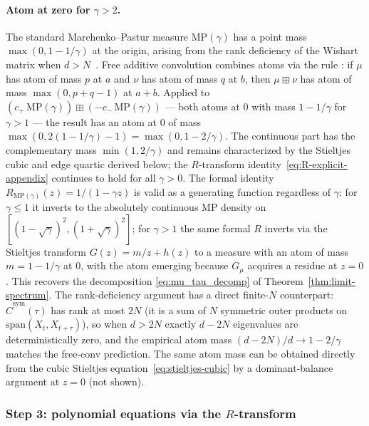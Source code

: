\documentclass{article}
\begin{document}
\paragraph{Atom at zero for $\gamma > 2$.}
The standard Marchenko--Pastur measure $\mathrm{MP}(\gamma)$ has a
point mass $\max(0, 1-1/\gamma)$ at the origin, arising from the
rank deficiency of the Wishart matrix when $d > N$~\cite{marchenko1967, bai2010}.
Free additive convolution combines atoms via the rule
\cite{nica2006}: if $\mu$ has atom of mass $p$ at $a$ and $\nu$ has
atom of mass $q$ at $b$, then $\mu \boxplus \nu$ has atom of mass
$\max(0, p + q - 1)$ at $a + b$. Applied to
$(c_+\,\mathrm{MP}(\gamma)) \boxplus (-c_-\,\mathrm{MP}(\gamma))$ —
both atoms at $0$ with mass $1 - 1/\gamma$ for $\gamma > 1$ — the
result has an atom at $0$ of mass
$\max(0, 2(1 - 1/\gamma) - 1) = \max(0, 1 - 2/\gamma)$. The continuous
part has the complementary mass $\min(1, 2/\gamma)$ and remains
characterized by the Stieltjes cubic and edge quartic derived below;
the $R$-transform identity~\eqref{eq:R-explicit-appendix} continues to
hold for all $\gamma > 0$. The formal identity $R_{\mathrm{MP}(\gamma)}(z) = 1/(1-\gamma z)$ is valid as a generating function regardless of $\gamma$: for $\gamma \le 1$ it inverts to the absolutely continuous MP density on $[(1-\sqrt\gamma)^2, (1+\sqrt\gamma)^2]$; for $\gamma > 1$ the same formal $R$ inverts via the Stieltjes transform $G(z) = m/z + h(z)$ to a measure with an atom of mass $m = 1 - 1/\gamma$ at $0$, with the atom emerging because $G_\mu$ acquires a residue at $z = 0$. This recovers the decomposition
\eqref{eq:mu_tau_decomp} of Theorem~\ref{thm:limit-spectrum}. The
rank-deficiency argument has a direct finite-$N$ counterpart:
$\hat C^{\mathrm{sym}}(\tau)$ has rank at most $2N$ (it is a sum of $N$ symmetric
outer products on $\mathrm{span}(X_t, X_{t+\tau})$), so when $d > 2N$
exactly $d - 2N$ eigenvalues are deterministically zero, and the
empirical atom mass $(d - 2N)/d \to 1 - 2/\gamma$ matches the free-conv
prediction. The same atom mass can be obtained directly from the cubic Stieltjes equation~\eqref{eq:stieltjes-cubic} by a dominant-balance argument at $z = 0$ (not shown).

\subsubsection{Step 3: polynomial equations via the $R$-transform}
\label{app:polynomial-derivation}
\end{document}

